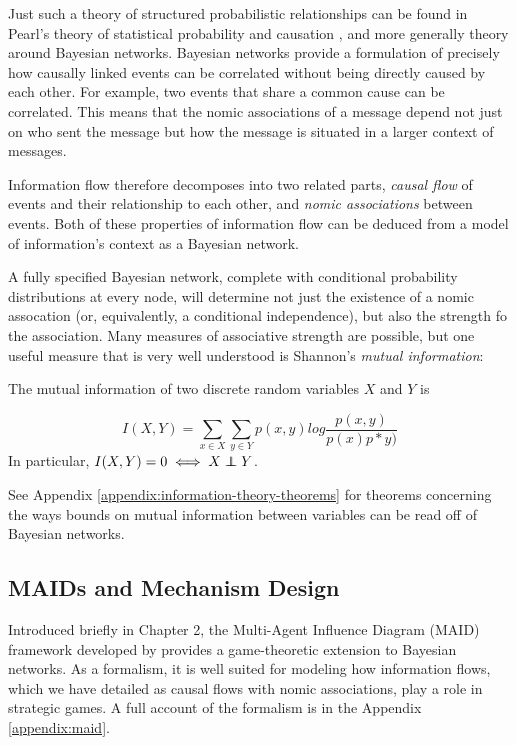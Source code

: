 \documentclass[../thesis.tex]{subfiles}
\begin{document}
Just such a theory of structured probabilistic relationships
can be found in Pearl's theory of statistical probability and causation 
\cite{pearl1988probabilistic}, and more generally theory
around Bayesian networks.
Bayesian networks provide a formulation of precisely how
causally linked events can be correlated without being
directly caused by each other. For example, two events that
share a common cause can be correlated.
This means that the nomic associations of a message depend
not just on who sent the message but how the message
is situated in a larger context of messages.

Information flow therefore decomposes into two related parts,
\emph{causal flow} of events and their relationship to each
other, and \emph{nomic associations} between events.
Both of these properties of information flow can be
deduced from a model of information's context as a
Bayesian network.

A fully specified Bayesian network, complete with
conditional probability distributions at every
node, will determine not just the existence of
a nomic assocation (or, equivalently, a conditional
independence), but also the strength fo the association.
Many measures of associative strength are possible,
but one useful measure that is very well understood is
Shannon's \emph{mutual information}:

\begin{dfn}
  The mutual information of two discrete random variables
  $X$ and $Y$ is

  $$I(X,Y) = \sum_{x \in X} \sum_{y \in Y} p(x,y) log \frac{p(x,y)}{p(x)p*y)}$$
  In particular, $I(X,Y) = 0 \iff X \independent Y$.
\end{dfn}

See Appendix \ref{appendix:information-theory-theorems} for
theorems concerning the ways bounds on mutual information
between variables can be read off of Bayesian networks.

\subsection{MAIDs and Mechanism Design}

Introduced briefly in Chapter 2, the Multi-Agent Influence Diagram
(MAID) framework developed by \cite{koller2003multi} provides
a game-theoretic extension to Bayesian networks.
As a formalism, it is well suited for modeling how
information flows, which we have detailed as causal
flows with nomic associations, play a role in strategic
games.
A full account of the formalism is in the
Appendix \ref{appendix:maid}.
\end{document}
